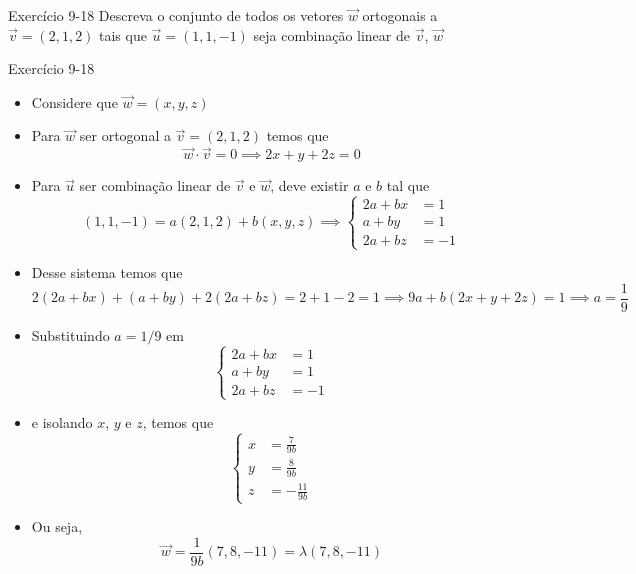 \begin{frame}[c]{Exercício 9-18}
    Descreva o conjunto de todos os vetores \(\vec{w}\) ortogonais a \(\vec{v}=(2,1,2)\) tais que
    \(\vec{u}=(1,1,-1)\) seja combinação linear de \(\vec{v}\), \(\vec{w}\)
\end{frame}
\begin{frame}{Exercício 9-18}
    \begin{itemize}[<+->]
        \item Considere que \(\vec{w}=(x,y,z)\)
        \item Para \(\vec{w}\) ser ortogonal a \(\vec{v}=(2,1,2)\) temos que
        \[
        \vec{w}\cdot \vec{v}=0 \implies 2x+y+2z=0
        \]
        \item Para \(\vec{u}\) ser combinação linear de \(\vec{v}\) e \(\vec{w}\), deve existir \(a\) e \(b\) tal que
        \[
        (1,1,-1)=a(2,1,2)+b(x,y,z) \implies
        \begin{cases}
        2a+bx &= 1 \\ a+by&=1 \\ 2a+bz&=-1
        \end{cases}
        \]
        \item Desse sistema temos que
        \[
        2(2a+bx)+(a+by)+2(2a+bz)=2+1-2=1 \implies 9a + b(2x+y+2z)=1 \implies a=\frac{1}{9}
        \]
    \end{itemize}

\end{frame}

\begin{frame}{}
    \begin{itemize}[<+->]
        \item Substituindo \(a=1/9\) em
        \[
            \begin{cases}
            2a+bx &= 1 \\ a+by&=1 \\ 2a+bz&=-1
            \end{cases}
        \]
        \item[]
        e isolando \(x\), \(y\) e \(z\), temos que
        \[
        \begin{cases}
            x&=\frac{7}{9b} \\ y&=\frac{8}{9b} \\ z&=-\frac{11}{9b}
        \end{cases}
        \]
        \item Ou seja,
        \[
        \vec{w}=\frac{1}{9b}(7,8,-11)=\lambda (7,8,-11)
        \]

    \end{itemize}
\end{frame}

